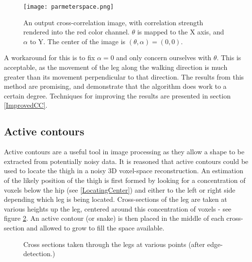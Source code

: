 \begin{figure}[tb]
	\vspace{-10pt}
	\centering
	\texttt{[image: parmeterspace.png]}
	\caption{An output cross-correlation image, with correlation strength rendered into the red color channel.
		$\theta$ is mapped to the X axis, and $\alpha$ to Y.
		The center of the image is $(\theta, \alpha) = (0,0)$.}
	\label{ParameterSpace}
\end{figure}

A workaround for this is to fix $\alpha = 0$ and only concern ourselves with $\theta$.
This is acceptable, as the movement of the leg along the walking direction is much greater than its movement perpendicular to that direction.
The results from this method are promising, and demonstrate that the algorithm does work to a certain degree.
Techniques for improving the results are presented in section \ref{ImprovedCC}.


\subsection{Active contours}

Active contours are a useful tool in image processing as they allow a shape to be extracted from potentially noisy data.
It is reasoned that active contours could be used to locate the thigh in a noisy 3D voxel-space reconstruction.
An estimation of the likely position of the thigh is first formed by looking for a concentration of voxels below the hip
(see \ref{LocatingCenter}) and either to the left or right side depending which leg is being located.
Cross-sections of the leg are taken at various heights up the leg, centered around this concentration of voxels - see figure \ref{CrossSections}.
An active contour (or snake) is then placed in the middle of each cross-section and allowed to grow to fill the space available.

\begin{figure}[tb]
	\vspace{-10pt}
	\centering
	\quad
	\caption{Cross sections taken through the legs at various points (after edge-detection.)}
	\label{CrossSections}
\end{figure}

